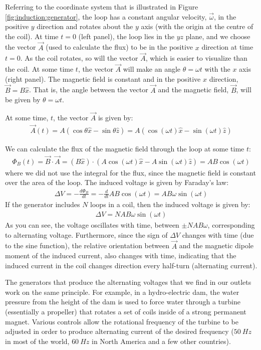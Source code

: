 Referring to the coordinate system that is illustrated in Figure \ref{fig:induction:generator}, the loop has a constant angular velocity, $\vec\omega$, in the positive $y$ direction and rotates about the $y$ axis (with the origin at the centre of the coil). At time $t=0$ (left panel), the loop lies in the $yz$ plane, and we choose the vector $\vec A$ (used to calculate the flux) to be in the positive $x$ direction at time $t=0$. As the coil rotates, so will the vector $\vec A$, which is easier to visualize than the coil. At some time $t$, the vector $\vec A$ will make an angle $\theta=\omega t$ with the $x$ axis (right panel). The magnetic field is constant and in the positive $x$ direction, $\vec B = B\hat x$. That is, the angle between the vector $\vec A$ and the magnetic field, $\vec B$, will be given by $\theta = \omega t$. 

At some time, $t$, the vector $\vec A$ is given by:
\begin{align*}
\vec A(t) = A(\cos\theta \hat x -\sin\theta \hat z) = A(\cos(\omega t) \hat x -\sin(\omega t)\hat z)
\end{align*}

We can calculate the flux of the magnetic field through the loop at some time $t$:
\begin{align*}
\Phi_B(t) =  \vec B \cdot \vec A = (B\hat x) \cdot (A\cos(\omega t) \hat x -A\sin(\omega t)\hat z)=AB\cos(\omega t)
\end{align*}
where we did not use the integral for the flux, since the magnetic field is constant over the area of the loop. The induced voltage is given by Faraday's law:
\begin{align*}
\Delta V = - \frac{d\Phi_B}{dt}  =  - \frac{d}{dt}AB\cos(\omega t) =  AB\omega\sin(\omega t)
\end{align*}
If the generator includes $N$ loops in a coil, then the induced voltage is given by:
\begin{align*}
\Delta V = NAB\omega\sin(\omega t)
\end{align*}
As you can see, the voltage oscillates with time, between $\pm NAB\omega$, corresponding to alternating voltage. Furthermore, since the sign of $\Delta V$ changes with time (due to the sine function), the relative orientation between $\vec A$ and the magnetic dipole moment of the induced current, also changes with time, indicating that the induced current in the coil changes direction every half-turn (alternating current).

The generators that produce the alternating voltages that we find in our outlets work on the same principle. For example, in a hydro-electric dam, the water pressure from the height of the dam is used to force water through a turbine (essentially a propeller) that rotates a set of coils inside of a strong permanent magnet. Various controls allow the rotational frequency of the turbine to be adjusted in order to produce alternating current of the desired frequency ($\SI{50}{Hz}$ in most of the world, $\SI{60}{Hz}$ in North America and a few other countries).

